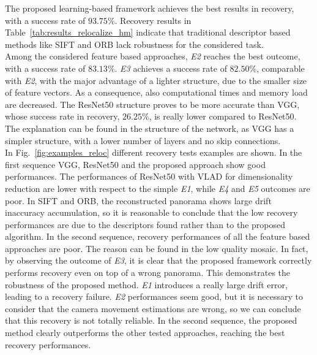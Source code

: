 \documentclass[sn-basic]{sn-jnl}%
\begin{document}
The proposed learning-based framework achieves the best results in recovery, with a success rate of $93.75\%$. 
Recovery results in Table~\ref{tab:results_relocalize_hm} indicate that traditional descriptor based methods like SIFT and ORB lack robustness for the considered task.\\

Among the considered feature based approaches, \textit{E2} reaches the best outcome, with a success rate of $83.13\%$. \textit{E3} achieves a success rate of $82.50\%$, comparable with \textit{E2}, with the major advantage of a lighter structure, due to the smaller size of feature vectors. As a consequence, also computational times and memory load are decreased. The ResNet50 structure proves to be more accurate than VGG, whose success rate in recovery, $26.25\%$, is really lower compared to ResNet50. The explanation can be found in the structure of the network, as VGG has a simpler structure, with a lower number of layers and no skip connections. \\

In Fig.~\ref{fig:examples_reloc} different recovery tests examples are shown. In the first sequence VGG, ResNet50 and the proposed approach show good performances. The performances of ResNet50 with VLAD for dimensionality reduction are lower with respect to the simple \textit{E1}, while \textit{E4} and \textit{E5} outcomes are poor. In SIFT and ORB, the reconstructed panorama shows large drift inaccuracy accumulation, so it is reasonable to conclude that the low recovery performances are due to the descriptors found rather than to the proposed algorithm. In the second sequence, recovery performances of all the feature based approaches are poor. The reason can be found in the low quality mosaic. In fact, by observing the outcome of \textit{E3}, it is clear that the proposed framework correctly performs recovery even on top of a wrong panorama. This demonstrates the robustness of the proposed method. \textit{E1} introduces a really large drift error, leading to a recovery failure. \textit{E2} performances seem good, but it is necessary to consider that the camera movement estimations are wrong, so we can conclude that this recovery is not totally reliable. In the second sequence, the proposed method clearly outperforms the other tested approaches, reaching the best recovery performances. 
\end{document}
